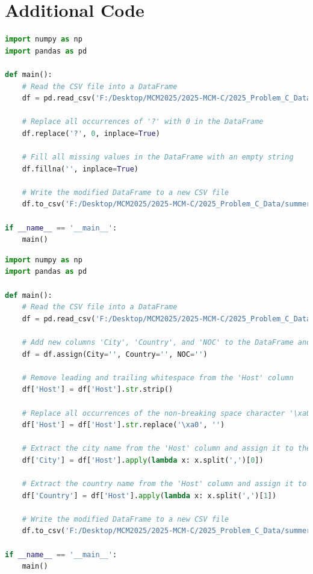 \documentclass[12pt]{article}
\begin{document}
\section{Additional Code}
\begin{lstlisting}[language=Python, style=mystyle, caption=data\_process\_programe.py]
import numpy as np
import pandas as pd

def main():
    # Read the CSV file into a DataFrame
    df = pd.read_csv('F:/Desktop/MCM2025/2025-MCM-C/2025_Problem_C_Data/summerOly_programs.csv')

    # Replace all occurrences of '?' with 0 in the DataFrame
    df.replace('?', 0, inplace=True)

    # Fill all missing values in the DataFrame with an empty string
    df.fillna('', inplace=True)

    # Write the modified DataFrame to a new CSV file
    df.to_csv('F:/Desktop/MCM2025/2025-MCM-C/2025_Problem_C_Data/summerOly_programs_completed.csv', index=False, encoding='utf-8')

if __name__ == '__main__':
    main()
\end{lstlisting}

\begin{lstlisting}[language=Python, style=mystyle, caption=data\_process\_hosts.py]
import numpy as np
import pandas as pd

def main():
    # Read the CSV file into a DataFrame
    df = pd.read_csv('F:/Desktop/MCM2025/2025-MCM-C/2025_Problem_C_Data/summerOly_hosts.csv')

    # Add new columns 'City', 'Country', and 'NOC' to the DataFrame and initialize them with empty strings
    df = df.assign(City='', Country='', NOC='')

    # Remove leading and trailing whitespace from the 'Host' column
    df['Host'] = df['Host'].str.strip()

    # Replace all occurrences of the non-breaking space character '\xa0' with an empty string in the 'Host' column
    df['Host'] = df['Host'].str.replace('\xa0', '')

    # Extract the city name from the 'Host' column and assign it to the 'City' column
    df['City'] = df['Host'].apply(lambda x: x.split(',')[0])

    # Extract the country name from the 'Host' column and assign it to the 'Country' column
    df['Country'] = df['Host'].apply(lambda x: x.split(',')[1])

    # Write the modified DataFrame to a new CSV file
    df.to_csv('F:/Desktop/MCM2025/2025-MCM-C/2025_Problem_C_Data/summerOly__hosts_completed.csv', index=False, encoding='utf-8')

if __name__ == '__main__':
    main()
\end{lstlisting}
\end{document}
